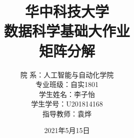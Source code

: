 \documentclass{ctexrep}
\newenvironment{pcenter}
 {\begin{center}\begin{varwidth}{\textwidth}\raggedright}
 {\end{varwidth}\end{center}}
\begin{document}


\title{ 
\huge \textsc{华中科技大学}\\
        \Large \textsc{数据科学基础大作业}
		\\ [2.0cm]
		\LARGE \textbf{\uppercase{矩阵分解}}
		\normalsize  \vspace*{5\baselineskip}
}


\author{
\begin{pcenter}
院\:\: \:\:系：人工智能与自动化学院\\ 
专业班级：自实1801\\
学生姓名：李子怡\\
学生学号：U201814168\\
指导教师：袁烨

\end{pcenter}
}


\date{2021年5月15日}

\maketitle


\maketitle
\frontmatter
{}              %

\tableofcontents
\thispagestyle{empty}				%


\mainmatter %
\pagestyle{plain}%
\baselineskip=23pt  %
\end{document}
